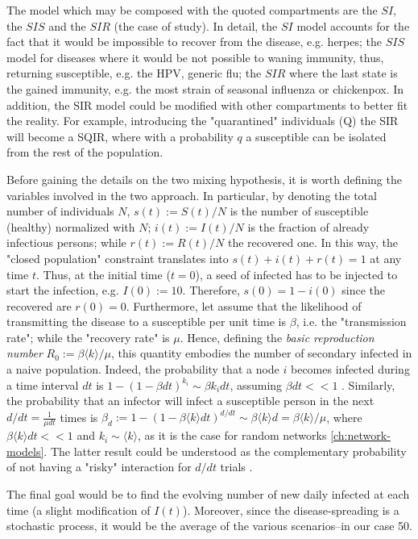 \documentclass[a4paper,10pt]{book} %
\theoremstyle{definition}
\begin{document}
The model which may be composed with the quoted compartments are the $SI$, the $SIS$ and the $SIR$ (the case of study). In detail, the $SI$ model accounts for the fact that it would be impossible to recover from the disease, e.g. herpes; the $SIS$ model for diseases where it would be not possible to waning immunity, thus, returning susceptible, e.g. the HPV, generic flu; the $SIR$ where the last state is the gained immunity, e.g. the most strain of seasonal influenza or chickenpox.
In addition, the SIR model could be modified with other compartments to better fit the reality. For example, introducing the "quarantined" individuals (Q) the SIR will become a SQIR, where with a probability $ q$ a susceptible can be isolated from the rest of the population.

Before gaining the details on the two mixing hypothesis, it is worth defining the variables involved in the two approach.
In particular, by denoting the total number of individuals $N$, $s(t) := S(t)/N$ is the number of susceptible (healthy) normalized with $N$; $i(t):=I(t)/N$ is the fraction of already infectious persons; while $r(t) := R(t)/N$ the recovered one. In this way, the "closed population" constraint translates into $s(t)+i(t)+r(t)=1$ at any time $t$. 
Thus, at the initial time ($t = 0$), a seed of infected has to be injected to start the infection, e.g. $I(0) := 10$. Therefore, $s(0) = 1 - i(0)$ since the recovered are $r(0) = 0$.
Furthermore, let assume that the likelihood of transmitting the disease to a susceptible per unit time is $\beta$, i.e. the "transmission rate"; while the "recovery rate" is $\mu$. Hence, defining the \textit{basic reproduction number}  $R_0 := \beta \langle k \rangle / \mu$, this quantity embodies the number of secondary infected in a naive population. Indeed, the probability that a node $i$  becomes infected during a time interval $dt$ is $1-(1-\beta dt)^{k_i} \sim \beta k_i dt$, assuming $ \beta dt << 1$ \cite{barabasi::2016networkbook}. Similarly, the probability that an infector will infect a susceptible person in the next $d/dt = \frac{1}{ \mu dt}$ times is $\beta_d:= 1-(1-\beta \langle k \rangle dt)^{d/dt} \sim \beta \langle k \rangle d = \beta \langle k \rangle/\mu$, where $ \beta \langle k \rangle dt << 1$ and $k_i \sim \langle k \rangle$, as it is the case for random networks \autoref{ch:network-models}. The latter result could be understood as the complementary probability of not having a "risky" interaction for $d/dt$ trials \cite{Thurner::Appendix_NetBasedExpl}. 

The final goal would be to find the evolving number of new daily infected at each time (a slight modification of $I(t)$). Moreover, since the disease-spreading is a stochastic process, it would be the average of the various scenarios--in our case 50.
\end{document}
